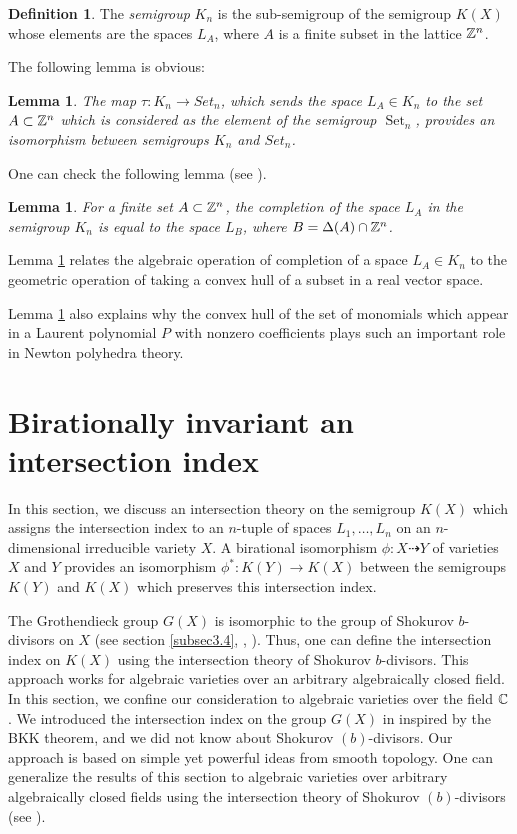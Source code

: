 \documentclass[11pt]{article}
\theoremstyle{plain}
\newtheorem{lemma}[theorem]{Lemma}
\theoremstyle{definition}
\newtheorem{definition}[theorem]{Definition}
\newcommand\Set{\operatorname{Set}}
\begin{document}
\begin{definition} The {\it semigroup}  $K_n$ is the sub-semigroup  of the semigroup $K(X)$ whose elements are the spaces $L_A$, where $A$ is a finite subset in the lattice $\Bbb Z^n$.
\end{definition}


The following lemma is obvious:

\begin{lemma} The map $\tau:K_n\to Set_n$, which sends the space $L_A\in K_n$ to the set $A\subset \Bbb Z^n$  which is considered as the element of the
semigroup $\Set_n$, provides an isomorphism between semigroups $K_n$ and $Set_n$.
\end{lemma}
One can check the following lemma (see  \cite{Kh92}).


\begin{lemma}\label{Delta} For a finite set $A\subset \Bbb Z^n$, the completion of the space $L_A$ in the semigroup $K_n$  is equal to the space $L_B$, where $B=\Delta(A)\cap \Bbb Z^n$.
\end{lemma}

Lemma \ref{Delta} relates the  algebraic operation of completion of a space $L_A\in K_n$  to the geometric operation of taking  a convex hull of a subset in a real vector space.

Lemma \ref{Delta} also explains why  the  convex hull  of the set of monomials which appear in a Laurent polynomial  $P$ with nonzero coefficients  plays such an important role in Newton polyhedra theory.


\section{ Birationally invariant an intersection index}\label{sect5}

In this section, we discuss an intersection theory
on the semigroup $K(X)$ which assigns the intersection index to an $n$-tuple of spaces $L_1,\dots,L_n$ on an $n$-dimensional irreducible variety $X$.  A birational isomorphism $\phi:X\dashrightarrow  Y$ of varieties $X$ and $Y$  provides an isomorphism $\phi^*: K(Y)\to K(X)$ between the semigroups $K(Y)$ and $K(X)$ which preserves this intersection index.


The Grothendieck group $G(X)$ is isomorphic to the group of Shokurov $b$-divisors on $X$ (see section \ref{subsec3.4},  \cite{Isk03},  \cite{K-K14}). Thus, one can define the intersection index on $K(X)$ using the intersection theory of Shokurov $b$-divisors. This approach works for algebraic varieties  over an  arbitrary algebraically closed field. In this section, we confine our consideration to algebraic varieties over the field $\Bbb C$. We introduced the  intersection  index on the group $G(X)$ in  \cite{K-K10} inspired by the BKK theorem, and we did not know about Shokurov $(b)$-divisors.
Our approach is based on simple yet powerful ideas from smooth topology. One can generalize the results of this section to algebraic varieties over arbitrary algebraically closed fields using the intersection theory of Shokurov $(b)$-divisors (see  \cite{K-K14}).
\end{document}
